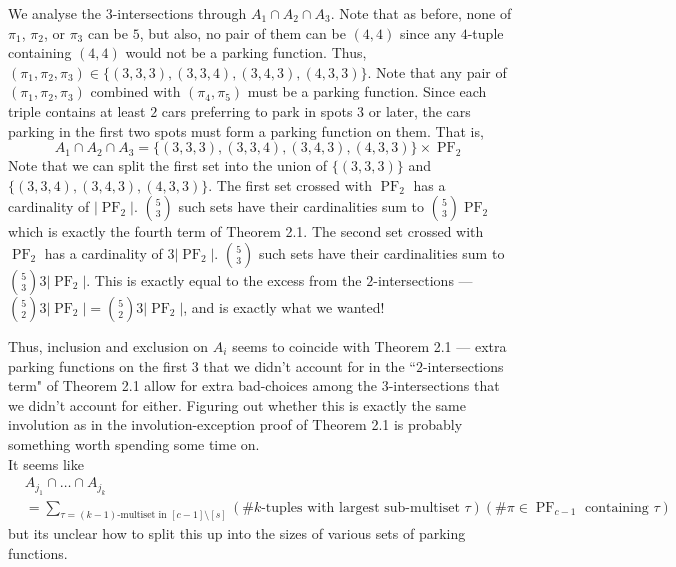 \begin{example}
	We analyse the $3$-intersections through $A_{1} \cap A_{2} \cap A_{3}$. Note that as before, none of $\pi_{1}$, $\pi_{2}$, or $\pi_{3}$ can be $5$, but also, no pair of them can be $(4, 4)$ since any  $4$-tuple containing $(4, 4)$ would not be a parking function. Thus, $(\pi_{1}, \pi_{2}, \pi_{3}) \in \{ (3, 3, 3), (3, 3, 4), (3, 4, 3), (4, 3, 3) \}$. Note that any pair of $(\pi_{1}, \pi_{2}, \pi_{3})$ combined with $(\pi_{4}, \pi_{5})$ must be a parking function. Since each triple contains at least $2$ cars preferring to park in spots $3$ or later, the cars parking in the first two spots must form a parking function on them. That is,
	\[
		A_{1} \cap A_{2} \cap A_{3} = \{ (3, 3, 3), (3, 3, 4), (3, 4, 3), (4, 3, 3) \} \times \operatorname{PF}_{2}
	\]
	Note that we can split the first set into the union of $\{ (3, 3, 3) \}$ and $\{ (3, 3, 4), (3, 4, 3), (4, 3, 3) \}$. The first set crossed with $\operatorname{PF}_{2}$ has a cardinality of $\lvert \operatorname{PF}_{2} \rvert$. $\binom{5}{3}$ such sets have their cardinalities sum to $\binom{5}{3} \operatorname{PF}_{2}$ which is exactly the fourth term of Theorem 2.1. The second set crossed with $\operatorname{PF}_{2}$ has a cardinality of $3 \lvert \operatorname{PF}_{2} \rvert$. $\binom{5}{3}$ such sets have their cardinalities sum to $\binom{5}{3} 3 \lvert \operatorname{PF}_{2} \rvert$. This is exactly equal to the excess from the $2$-intersections --- $\binom{5}{2} 3 \lvert \operatorname{PF}_{2} \rvert = \binom{5}{2} 3 \lvert \operatorname{PF}_{2} \rvert$, and is exactly what we wanted!
\end{example}

Thus, inclusion and exclusion on $A_{i}$ seems to coincide with Theorem 2.1 --- extra parking functions on the first $3$ that we didn't account for in the ``$2$-intersections term" of Theorem 2.1 allow for extra bad-choices among the $3$-intersections that we didn't account for either. Figuring out whether this is exactly the same involution as in the involution-exception proof of Theorem 2.1 is probably something worth spending some time on. \\

It seems like
\[
	\begin{split}
		& A_{j_{1}} \cap \dots \cap A_{j_{k}} \\
		& = \sum_{\tau = (k - 1)\text{-multiset in } [c - 1] \setminus [s]} (\# k\text{-tuples with largest sub-multiset } \tau) (\# \pi \in \operatorname{PF}_{c - 1} \text{ containing } \tau)
	\end{split}
\]
but its unclear how to split this up into the sizes of various sets of parking functions.

